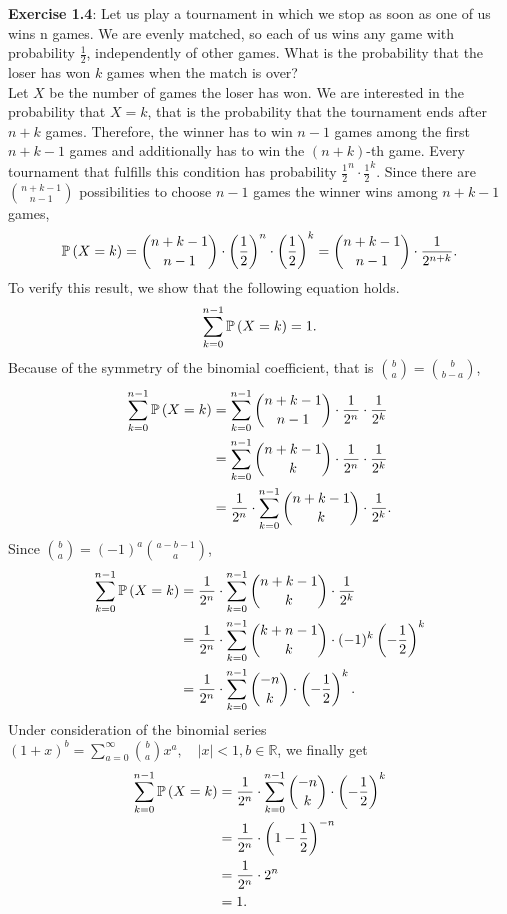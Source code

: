 \textbf{Exercise 1.4}: Let us play a tournament in which we stop as soon as one
of us wins n games. We are evenly matched, so each of us wins any game with probability $\frac{1}{2}$, independently of other games. What is the probability that the loser has won $k$ games when the match is over? \\[0.2cm]
Let $X$ be the number of games the loser has won. We are interested in the probability that $X = k$, that is the probability that the tournament ends after $n + k$ games. Therefore, the winner has to win $n-1$ games among the first $n + k - 1$ games and additionally has to win the $(n+k)$-th game. Every tournament that fulfills this condition has probability $\frac{1}{2}^n \cdot \frac{1}{2}^{k}$. Since there are $\binom{n+k-1}{n-1}$ possibilities to choose $n-1$ games the winner wins among $n+k-1$ games,
\[
  \mathbb{P}\left(X = k\right)
    = \binom{n+k-1}{n-1} \cdot \left(\frac{1}{2}\right)^n \cdot \left(\frac{1}{2}\right)^{k}
    = \binom{n+k-1}{n-1} \cdot \frac{1}{2^{n+k}}.
\]
To verify this result, we show that the following equation holds.
\[
  \sum_{k=0}^{n-1}\mathbb{P}\left(X=k\right) = 1.
\]
Because of the symmetry of the binomial coefficient, that is $\binom{b}{a} = \binom{b}{b - a}$,
\begin{align*}
  \sum_{k=0}^{n-1}\mathbb{P}\left(X=k\right)
    &= \sum_{k=0}^{n-1} \binom{n+k-1}{n-1} \cdot \frac{1}{2^n} \cdot \frac{1}{2^k} \\
    &= \sum_{k=0}^{n-1} \binom{n+k-1}{k} \cdot \frac{1}{2^n} \cdot \frac{1}{2^k} \\
    &= \frac{1}{2^n} \cdot \sum_{k=0}^{n-1} \binom{n+k-1}{k} \cdot \frac{1}{2^k}.
\end{align*}
Since $\binom{b}{a} = (-1)^a \binom{a - b - 1}{a}$,
\begin{align*}
  \sum_{k=0}^{n-1}\mathbb{P}\left(X=k\right)
    &= \frac{1}{2^n} \cdot \sum_{k=0}^{n-1} \binom{n+k-1}{k} \cdot \frac{1}{2^k} \\
    &= \frac{1}{2^n} \cdot \sum_{k=0}^{n-1} \binom{k+n-1}{k} \cdot (-1)^k \left(- \frac{1}{2}\right)^{k} \\
    &= \frac{1}{2^n} \cdot \sum_{k=0}^{n-1} \binom{-n}{k} \cdot \left(- \frac{1}{2}\right)^{k}.
\end{align*}
Under consideration of the binomial series $(1 + x)^b = \sum_{a=0}^{\infty} \binom{b}{a}x^a, \quad |x| < 1, b \in \mathbb{R}$, we finally get
\begin{align*}
  \sum_{k=0}^{n-1}\mathbb{P}\left(X=k\right)
    &= \frac{1}{2^n} \cdot \sum_{k=0}^{n-1} \binom{-n}{k} \cdot \left(- \frac{1}{2}\right)^{k} \\
    &= \frac{1}{2^n} \cdot \left(1 - \frac{1}{2}\right)^{-n} \\
    &= \frac{1}{2^n} \cdot 2^n \\
    &= 1.
\end{align*}
